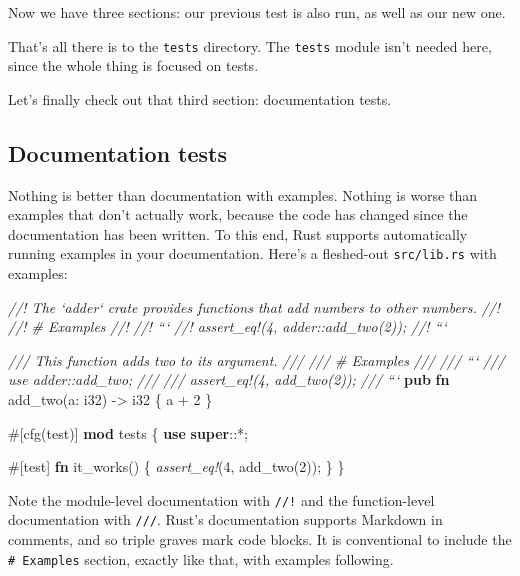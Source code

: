 \documentclass[a4paper,]{book}
\newenvironment{Shaded}{\begin{snugshade}}{\end{snugshade}}
\newcommand{\KeywordTok}[1]{\textcolor[rgb]{0.13,0.29,0.53}{\textbf{{#1}}}}
\newcommand{\DataTypeTok}[1]{\textcolor[rgb]{0.13,0.29,0.53}{{#1}}}
\newcommand{\DecValTok}[1]{\textcolor[rgb]{0.00,0.00,0.81}{{#1}}}
\newcommand{\CommentTok}[1]{\textcolor[rgb]{0.56,0.35,0.01}{\textit{{#1}}}}
\newcommand{\PreprocessorTok}[1]{\textcolor[rgb]{0.56,0.35,0.01}{\textit{{#1}}}}
\newcommand{\AttributeTok}[1]{\textcolor[rgb]{0.77,0.63,0.00}{{#1}}}
\newcommand{\NormalTok}[1]{{#1}}
\begin{document}
Now we have three sections: our previous test is also run, as well as
our new one.

That's all there is to the \texttt{tests} directory. The \texttt{tests}
module isn't needed here, since the whole thing is focused on tests.

Let's finally check out that third section: documentation tests.

\subsection{Documentation tests}\label{documentation-tests}

Nothing is better than documentation with examples. Nothing is worse
than examples that don't actually work, because the code has changed
since the documentation has been written. To this end, Rust supports
automatically running examples in your documentation. Here's a
fleshed-out \texttt{src/lib.rs} with examples:

\begin{Shaded}
\begin{Highlighting}[]
\CommentTok{//! The `adder` crate provides functions that add numbers to other numbers.}
\CommentTok{//!}
\CommentTok{//! # Examples}
\CommentTok{//!}
\CommentTok{//! ```}
\CommentTok{//! assert_eq!(4, adder::add_two(2));}
\CommentTok{//! ```}

\CommentTok{/// This function adds two to its argument.}
\CommentTok{///}
\CommentTok{/// # Examples}
\CommentTok{///}
\CommentTok{/// ```}
\CommentTok{/// use adder::add_two;}
\CommentTok{///}
\CommentTok{/// assert_eq!(4, add_two(2));}
\CommentTok{/// ```}
\KeywordTok{pub} \KeywordTok{fn} \NormalTok{add_two(a: }\DataTypeTok{i32}\NormalTok{) -> }\DataTypeTok{i32} \NormalTok{\{}
    \NormalTok{a + }\DecValTok{2}
\NormalTok{\}}

\AttributeTok{#[}\NormalTok{cfg}\AttributeTok{(}\NormalTok{test}\AttributeTok{)]}
\KeywordTok{mod} \NormalTok{tests \{}
    \KeywordTok{use} \KeywordTok{super}\NormalTok{::*;}

    \AttributeTok{#[}\NormalTok{test}\AttributeTok{]}
    \KeywordTok{fn} \NormalTok{it_works() \{}
        \PreprocessorTok{assert_eq!}\NormalTok{(}\DecValTok{4}\NormalTok{, add_two(}\DecValTok{2}\NormalTok{));}
    \NormalTok{\}}
\NormalTok{\}}
\end{Highlighting}
\end{Shaded}

Note the module-level documentation with \texttt{//!} and the
function-level documentation with \texttt{///}. Rust's documentation
supports Markdown in comments, and so triple graves mark code blocks. It
is conventional to include the \texttt{\#\ Examples} section, exactly
like that, with examples following.
\end{document}
